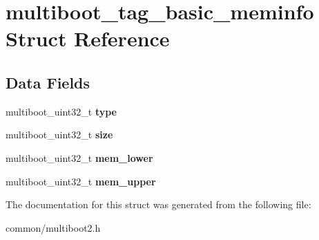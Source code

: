 \hypertarget{structmultiboot__tag__basic__meminfo}{}\section{multiboot\+\_\+tag\+\_\+basic\+\_\+meminfo Struct Reference}
\label{structmultiboot__tag__basic__meminfo}
\subsection*{Data Fields}
\begin{DoxyCompactItemize}
\item 
multiboot\+\_\+uint32\+\_\+t {\bfseries type}\hypertarget{structmultiboot__tag__basic__meminfo_a0cd6fd3c9f2de7ee9bb8354589bd3545}{}\label{structmultiboot__tag__basic__meminfo_a0cd6fd3c9f2de7ee9bb8354589bd3545}

\item 
multiboot\+\_\+uint32\+\_\+t {\bfseries size}\hypertarget{structmultiboot__tag__basic__meminfo_a86060b6871a2c0036465aab04b4c7edf}{}\label{structmultiboot__tag__basic__meminfo_a86060b6871a2c0036465aab04b4c7edf}

\item 
multiboot\+\_\+uint32\+\_\+t {\bfseries mem\+\_\+lower}\hypertarget{structmultiboot__tag__basic__meminfo_aaabdaf3c52dd3be82d1ab4fbd50f9004}{}\label{structmultiboot__tag__basic__meminfo_aaabdaf3c52dd3be82d1ab4fbd50f9004}

\item 
multiboot\+\_\+uint32\+\_\+t {\bfseries mem\+\_\+upper}\hypertarget{structmultiboot__tag__basic__meminfo_ae329d0036de802dbac0b6bd991495738}{}\label{structmultiboot__tag__basic__meminfo_ae329d0036de802dbac0b6bd991495738}

\end{DoxyCompactItemize}


The documentation for this struct was generated from the following file\+:\begin{DoxyCompactItemize}
\item 
common/multiboot2.\+h\end{DoxyCompactItemize}
